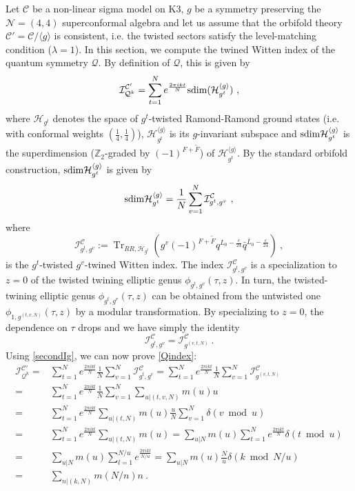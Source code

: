 \documentclass[a4paper,11pt]{article}
\newcommand{\ZZ}{\mathbb{Z}}
\newcommand{\C}{\mathcal{C}}
\newcommand{\Hh}{\mathcal{H}}
\newcommand{\I}{\mathcal{I}}
\newcommand{\N}{\mathcal{N}}
\newcommand{\Q}{\mathcal{Q}}
\DeclareMathOperator{\Tr}{Tr}
\numberwithin{equation}{section}
\def\be{\begin{equation}}
\def\ee{\end{equation}}
\begin{document}
Let $\C$ be a non-linear sigma model on K3, $g$ be a symmetry preserving the $\N=(4,4)$ superconformal algebra and let us assume that the orbifold theory $\C'=\C/\langle g\rangle$ is consistent, i.e. the twisted sectors satisfy the level-matching condition ($\lambda=1$).  In this section, we compute the twined Witten index of the quantum symmetry $\Q$.
By definition of $\Q$, this is given by
\be \I^{\C'}_{\Q^k}=\sum_{t=1}^N e^{\frac{2\pi i kt}{N}} {\rm sdim}(\Hh^{\langle g\rangle}_{g^t})\ ,
\ee where $\Hh_{g^t}$ denotes the space of $g^t$-twisted Ramond-Ramond ground states (i.e. with conformal weights $(\frac{1}{4},\frac{1}{4})$), $\Hh^{\langle g\rangle}_{g^t}$ is its $g$-invariant subspace and  ${\rm sdim}\Hh^{\langle g\rangle}_{g^t}$ is the superdimension ($\ZZ_2$-graded by $(-1)^{F+\tilde F}$)  of $\Hh^{\langle g\rangle}_{g^t}$. By the standard orbifold construction,  ${\rm sdim}\Hh^{\langle g\rangle}_{g^t}$ is given by
\be {\rm sdim}\Hh^{\langle g\rangle}_{g^t}=\frac{1}{N}\sum_{v=1}^N \I^{\C}_{g^t,g^v}\ ,
\ee where 
\be \I^{\C}_{g^t,g^v}:=\Tr_{RR,\Hh_{g^t}}(g^v(-1)^{F+\tilde F}q^{L_0-\frac{c}{24}}\bar q^{\bar L_0-\frac{c}{24}})\ ,
\ee is the $g^t$-twisted $g^v$-twined Witten index. The index $\I^{\C}_{g^t,g^v}$ is a specialization to $z=0$ of the twisted twining elliptic genus $\phi_{g^t,g^v}(\tau,z)$. In turn, the twisted-twining elliptic genus $\phi_{g^t,g^v}(\tau,z)$ can be obtained from the untwisted one $\phi_{1,g^{(t,v,N)}}(\tau,z)$ by a modular transformation. By specializing to $z=0$, the dependence on $\tau$ drops and we have simply the identity
\be \I^{\C}_{g^t,g^v}=\I^{\C}_{g^{(v,t,N)}}\ .
\ee Using \eqref{secondIg}, we can now prove \eqref{Qindex}:
\be \begin{split}
\I^{\C'}_{\Q^k}=&\sum_{t=1}^N e^{\frac{2\pi i kt}{N}}\frac{1}{N}\sum_{v=1}^N \I^{\C}_{g^t,g^v}=\sum_{t=1}^N e^{\frac{2\pi i kt}{N}}\frac{1}{N}\sum_{v=1}^N\I^{\C}_{g^{(v,t,N)}}\\
=& \sum_{t=1}^N e^{\frac{2\pi i kt}{N}}\frac{1}{N}\sum_{v=1}^N\sum_{u|(t,v,N)} m(u)u\\
=&\sum_{t=1}^N e^{\frac{2\pi i kt}{N}}\sum_{u|(t,N)}m(u)\frac{u}{N}\sum_{v=1}^{N}\delta(v \bmod u)\\
=&\sum_{t=1}^N e^{\frac{2\pi i kt}{N}}\sum_{u|(t,N)}m(u)=
\sum_{u|N}m(u)\sum_{t=1}^N e^{\frac{2\pi i kt}{N}}\delta(t\bmod u)\\
=&\sum_{u|N}m(u)\sum_{l=1}^{N/u} e^{\frac{2\pi i kl}{N/u}}=\sum_{u|N}m(u)\frac{N}{u}\delta(k\bmod N/u)\\
=&\sum_{n|(k,N)}m(N/n)n\ .
\end{split}\ee
\end{document}
